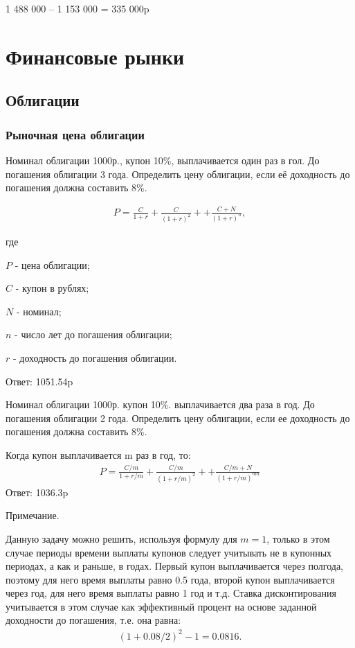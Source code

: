 \documentclass[12pt, table, a4paper,twoside]{exam}
\begin{document}
\begin{questions}
\begin{subparts}
\begin{solution}[12em]
		1 488 000 – 1 153 000 = 335 000p
		
	\end{solution}
	
\end{subparts}
\addpoints



\cleardoublepage
\section{Финансовые рынки}
\subsection{Облигации}
\subsubsection{Рыночная цена облигации}
\question[10] Номинал облигации 1000р., купон 10\%, выплачивается один раз в гол. До погашения облигации 3 года. Определить цену облигации, если её доходность до погашения должна составить 8\%.

\begin{solution}[12em]
	\begin{align}
	P=\frac{C}{1+r} + \frac{C}{(1+r)^2} + + \frac{C+N}{(1+r)^n},
	\end{align}
	\raggedright
	где
	
	$P$ - цена облигации;
	
	$C$ - купон в рублях;
	
	$N$ - номинал;
	
	$n$ - число лет до погашения облигации;
	
	$r$ - доходность до погашения облигации.
	
	Ответ: 1051.54p
\end{solution}


\question[10] Номинал облигации 1000р. купон 10\%. выплачивается два раза в год. До погашения облигации 2 года. Определить цену облигации, если ее доходность до погашения должна составить 8\%.

\begin{solution}[12em]
	\raggedright
	Когда купон выплачивается m раз в год, то:
	\begin{align}
	P=\frac{C/m}{1+r/m} + \frac{C/m}{(1+r/m)^2} + + \frac{C/m+N}{(1+r/m)^{mn}}
	\end{align}
	Ответ: 1036.3p
	
	Примечание.
	
	Данную задачу можно решить, используя формулу для $m=1$, только в этом случае периоды времени выплаты купонов следует учитывать не в купонных периодах, а как и раньше, в годах. Первый купон выплачивается через полгода, поэтому для него время выплаты равно 0.5 года, второй купон выплачивается через год, для него время выплаты равно 1 год и т.д. Ставка дисконтирования учитывается в этом случае как эффективный процент на основе заданной доходности до погашения, т.е. она равна:
	\begin{align*}
	(1+0.08/2)^2-1=0.0816.
	\end{align*}
	

\end{solution}
\end{questions}
\end{document}
